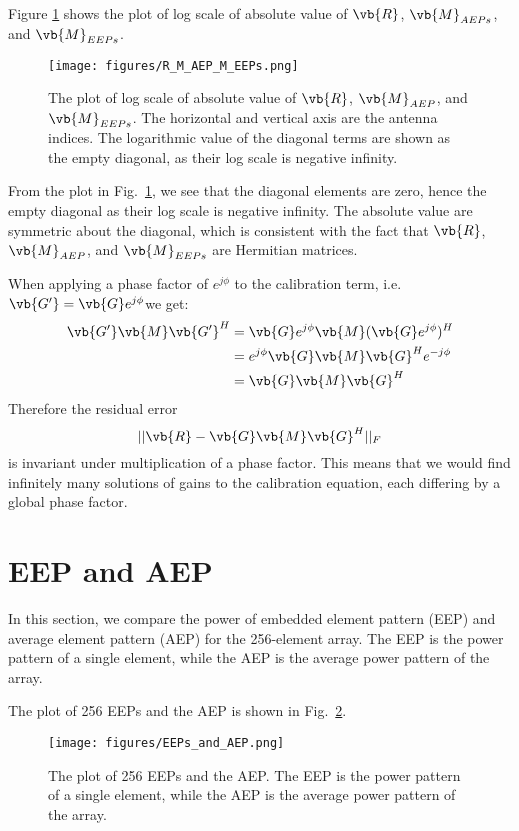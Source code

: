 \documentclass[10pt,a4paper,twocolumn]{paper}
\begin{document}
Figure \ref{fig:R_M_AEP_M_EEPs} shows the plot of log scale of absolute value of $\vb{R}$, $\vb{M}_{AEPs}$, and $\vb{M}_{EEPs}$.

\begin{figure}[H]
    \centering
    \texttt{[image: figures/R\_M\_AEP\_M\_EEPs.png]}
    \caption{The plot of log scale of absolute value of $\vb{R}$, $\vb{M}_{AEP}$, and $\vb{M}_{EEPs}$. The horizontal and vertical axis are the antenna indices. The logarithmic value of the diagonal terms are shown as the empty diagonal, as their log scale is negative infinity.}
    \label{fig:R_M_AEP_M_EEPs}
\end{figure}

From the plot in Fig.~\ref{fig:R_M_AEP_M_EEPs}, we see that the diagonal elements are zero, hence the empty diagonal as their log scale is negative infinity. The absolute value are symmetric about the diagonal, which is consistent with the fact that $\vb{R}$, $\vb{M}_{AEP}$, and $\vb{M}_{EEPs}$ are Hermitian matrices.

When applying a phase factor of $e^{j\phi}$ to the calibration term, i.e. $\vb{G'} = \vb{G}e^{j\phi}$we get:
\begin{align*}
        \vb{G'}\vb{M}\vb{G'}^{H}
        &= \vb{G}e^{j\phi}\vb{M}(\vb{G}e^{j\phi})^{H}\\
        &= e^{j\phi}\vb{G}\vb{M}\vb{G}^{H}e^{-j\phi}\\
        &= \vb{G}\vb{M}\vb{G}^{H}
\end{align*}
Therefore the residual error 
\begin{equation}
    ||\vb{R} - \vb{G}\vb{M}\vb{G}^{H}||_{F}
    \label{eq:F_norm_error}
\end{equation}
is invariant under multiplication of a phase factor.
This means that we would find infinitely many solutions of gains to the calibration equation, each differing by a global phase factor. 

\section{EEP and AEP}
In this section, we compare the power of embedded element pattern (EEP) and average element pattern (AEP) for the 256-element array. The EEP is the power pattern of a single element, while the AEP is the average power pattern of the array.

The plot of 256 EEPs and the AEP is shown in Fig.~\ref{fig:EEPs_and_AEP}. 
\begin{figure}[H]
    \centering
    \texttt{[image: figures/EEPs\_and\_AEP.png]}
    \caption{The plot of 256 EEPs and the AEP. The EEP is the power pattern of a single element, while the AEP is the average power pattern of the array.}
    \label{fig:EEPs_and_AEP}
\end{figure}
\end{document}
